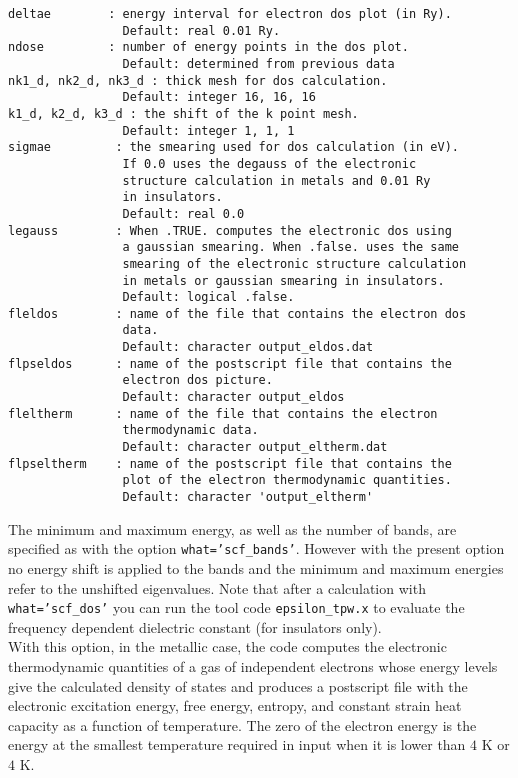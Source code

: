 \documentclass[12pt,a4paper,twoside]{report}
\begin{document}
\begin{verbatim} 
deltae        : energy interval for electron dos plot (in Ry).
                Default: real 0.01 Ry.
ndose         : number of energy points in the dos plot.
                Default: determined from previous data
nk1_d, nk2_d, nk3_d : thick mesh for dos calculation.
                Default: integer 16, 16, 16
k1_d, k2_d, k3_d : the shift of the k point mesh.
                Default: integer 1, 1, 1
sigmae         : the smearing used for dos calculation (in eV).
                If 0.0 uses the degauss of the electronic 
                structure calculation in metals and 0.01 Ry 
                in insulators.
                Default: real 0.0 
legauss        : When .TRUE. computes the electronic dos using 
                a gaussian smearing. When .false. uses the same 
                smearing of the electronic structure calculation 
                in metals or gaussian smearing in insulators.
                Default: logical .false.
fleldos        : name of the file that contains the electron dos 
                data.
                Default: character output_eldos.dat
flpseldos      : name of the postscript file that contains the 
                electron dos picture.
                Default: character output_eldos
fleltherm      : name of the file that contains the electron 
                thermodynamic data.
                Default: character output_eltherm.dat
flpseltherm    : name of the postscript file that contains the 
                plot of the electron thermodynamic quantities.
                Default: character 'output_eltherm'
\end{verbatim}

The minimum and maximum energy, as well as the number of bands,
are specified as with the option \texttt{what='scf\_bands'}.
However with the present option no energy shift is applied to the bands
and the minimum and maximum energies refer to the unshifted eigenvalues.
Note that after a calculation with \texttt{what='scf\_dos'} you can
run the tool code \texttt{epsilon\_tpw.x} to evaluate the frequency
dependent dielectric constant (for insulators only). \\
With this option, in the metallic case, 
the code computes the electronic thermodynamic quantities of
a gas of independent electrons whose energy levels give the calculated 
density of states and produces a postscript file
with the electronic excitation energy, free energy, entropy,
and constant strain heat capacity as a function of temperature. 
The zero of the electron energy is the energy at the smallest temperature 
required in input when it is lower than $4$ K or $4$ K. \\
\end{document}
